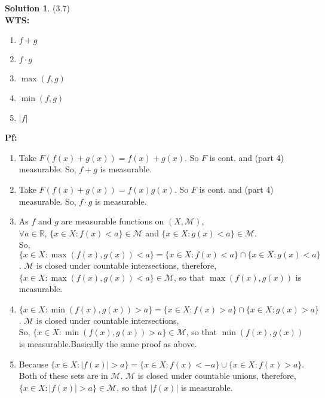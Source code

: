 \documentclass[letterpaper,12pt]{article}
\theoremstyle{definition}
\newtheorem{solution}[theorem]{Solution}
\begin{document}
\begin{solution}{(3.7)} \\
\textbf{WTS:}
\begin{enumerate}
	\item $f + g$
	\item $f \cdot g$
	\item $\max(f,g)$
	\item $\min(f,g)$
	\item $|f|$
\end{enumerate}
\textbf{Pf:}
\begin{enumerate}
  \item Take $F(f(x) + g(x)) = f(x) + g(x)$. So $F$ is cont. and (part 4) measurable. So, $f + g$ is measurable.
  \item Take $F(f(x) + g(x)) = f(x)g(x)$. So $F$ is cont. and (part 4) measurable. So, $f \cdot g$ is measurable.
  \item As $f$ and $g$ are measurable functions on $(X,\mathcal{M})$, \\$ \forall a \in \mathbb{R}$, $\{x \in X : f(x) < a \} \in \mathcal{M}$ and $\{x \in X : g(x) < a \} \in \mathcal{M}$. \\
  So,  $$\{x \in X : \max(f(x),g(x)) < a \} = \{x \in X : f(x) < a \} \cap \{x \in X : g(x) < a \}$$. $\mathcal{M}$ is closed under countable intersections, therefore, $\{x \in X : \max(f(x),g(x)) < a \} \in \mathcal{M}$, so that $\max(f(x), g(x))$ is measurable.
  \item $\{x \in X : \min(f(x),g(x)) > a \} = \{x \in X : f(x) > a \} \cap \{x \in X : g(x) > a \}$. $\mathcal{M}$ is closed under countable intersections, \\
  So, $\{x \in X : \min(f(x),g(x)) > a \} \in \mathcal{M}$, so that $\min(f(x), g(x))$ is measurable.Basically the same proof as above.
  \item Because $\{x \in X : |f(x)| > a \} = \{x \in X : f(x) < -a \} \cup \{x \in X : f(x) > a \}$. Both of these sets are in $\mathcal{M}$. $\mathcal{M}$ is closed under countable unions, therefore, $\{x \in X : |f(x)| > a \} \in \mathcal{M}$, so that $|f(x)|$ is measurable.
\end{enumerate}
\end{solution}
\end{document}
